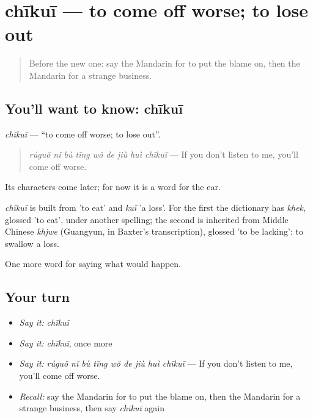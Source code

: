 \section[chīkuī]{chīkuī — to come off worse; to lose out}

\label{lesson:ZH-C539-chikui}



\begin{quote}
Before the new one: say the Mandarin for to put the blame on, then the Mandarin for a strange business.
\end{quote}

\subsection*{You'll want to know: chīkuī}
\emph{chīkuī} — \textquotedblleft{}to come off worse; to lose out\textquotedblright{}.

\begin{quote}
\emph{rúguǒ nǐ bù tīng wǒ de jiù huì chīkuī} — If you don't listen to me, you'll come off worse.
\end{quote}

Its characters come later; for now it is a word for the ear.

\begin{cousinweb}
\emph{chīkuī} is built from  'to eat' and \emph{kuī} 'a loss'. For the first the dictionary has \emph{khek}, glossed 'to eat', under another spelling; the second is inherited from Middle Chinese \emph{khjwe} (Guangyun, in Baxter's transcription), glossed 'to be lacking': to swallow a loss.
\end{cousinweb}

\begin{grammarlens}[title={What you've built}]
One more word for saying what would happen.
\end{grammarlens}

\subsection*{Your turn}
\begin{itemize}
\raggedright
  \item \emph{Say it:} \emph{chīkuī}
  \item \emph{Say it:} \emph{chīkuī}, once more
  \item \emph{Say it:} \emph{rúguǒ nǐ bù tīng wǒ de jiù huì chīkuī} — If you don't listen to me, you'll come off worse.
  \item \emph{Recall:} say the Mandarin for to put the blame on, then the Mandarin for a strange business, then say \emph{chīkuī} again
\end{itemize}


